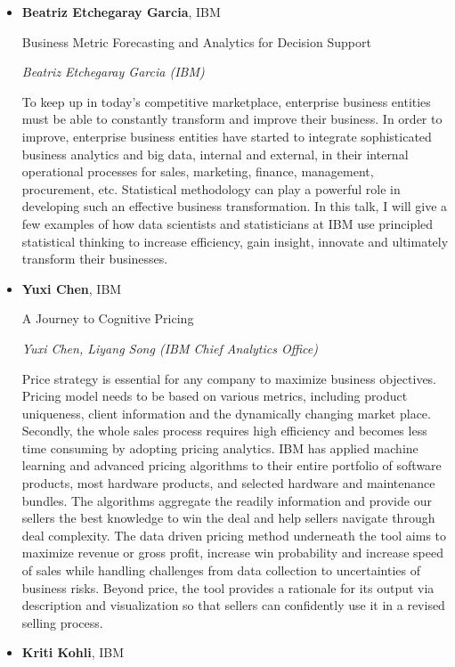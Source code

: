 \begin{itemize}
\item \textbf{Beatriz Etchegaray Garcia}, IBM

Business Metric Forecasting and Analytics for Decision Support

\emph{\footnotesize Beatriz Etchegaray Garcia (IBM)}

To keep up in today's competitive marketplace, enterprise business entities must be able to constantly transform and improve their business. In order to improve, enterprise business entities have started to integrate sophisticated business analytics and big data, internal and external, in their internal operational processes for sales, marketing, finance, management, procurement, etc. Statistical methodology can play a powerful role in developing such an effective business transformation. In this talk, I will give a few examples of how data scientists and statisticians at IBM use principled statistical thinking to increase efficiency, gain insight, innovate and ultimately transform their businesses.

\item \textbf{Yuxi Chen}, IBM

A Journey to Cognitive Pricing

\emph{\footnotesize Yuxi Chen, Liyang Song (IBM Chief Analytics Office)}

Price strategy is essential for any company to maximize business objectives.  Pricing model needs to be based on various metrics, including product uniqueness, client information and the dynamically changing market place. Secondly, the whole sales process requires high efficiency and becomes less time consuming by adopting pricing analytics. IBM has applied machine learning and advanced pricing algorithms to their entire portfolio of software products, most hardware products, and selected hardware and maintenance bundles. The algorithms aggregate the readily information and provide our sellers the best knowledge to win the deal and help sellers navigate through deal complexity. The data driven pricing method underneath the tool aims to maximize revenue or gross profit, increase win probability and increase speed of sales while handling challenges from data collection to uncertainties of business risks. Beyond price, the tool provides a rationale for its output via description and visualization so that sellers can confidently use it in a revised selling process.  

\item \textbf{Kriti Kohli}, IBM


\end{itemize}
